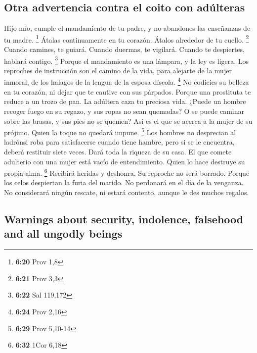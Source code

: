 \begin{paracol}{2}
\hypertarget{otra-advertencia-contra-el-coito-con-aduxfalteras}{%
\subsection{Otra advertencia contra el coito con
adúlteras}\label{otra-advertencia-contra-el-coito-con-aduxfalteras}}

 Hijo mío, cumple el mandamiento de tu padre, y no
abandones las enseñanzas de tu madre. \footnote{\textbf{6:20} Prov 1,8}
 Átalas continuamente en tu corazón. Átalos alrededor de
tu cuello. \footnote{\textbf{6:21} Prov 3,3}  Cuando
camines, te guiará. Cuando duermas, te vigilará. Cuando te despiertes,
hablará contigo. \footnote{\textbf{6:22} Sal 119,172} 
Porque el mandamiento es una lámpara, y la ley es ligera. Los reproches
de instrucción son el camino de la vida,  para alejarte
de la mujer inmoral, de los halagos de la lengua de la esposa díscola.
\footnote{\textbf{6:24} Prov 2,16}  No codicies su
belleza en tu corazón, ni dejar que te cautive con sus párpados.
 Porque una prostituta te reduce a un trozo de pan. La
adúltera caza tu preciosa vida.  ¿Puede un hombre recoger
fuego en su regazo, y sus ropas no sean quemadas?  O se
puede caminar sobre las brasas, y sus pies no se quemen? 
Así es el que se acerca a la mujer de su prójimo. Quien la toque no
quedará impune. \footnote{\textbf{6:29} Prov 5,10-14} 
Los hombres no desprecian al ladrónsi roba para satisfacerse cuando
tiene hambre,  pero si se le encuentra, deberá restituir
siete veces. Dará toda la riqueza de su casa.  El que
comete adulterio con una mujer está vacío de entendimiento. Quien lo
hace destruye su propia alma. \footnote{\textbf{6:32} 1Cor 6,18}
 Recibirá heridas y deshonra. Su reproche no será
borrado.  Porque los celos despiertan la furia del
marido. No perdonará en el día de la venganza.  No
considerará ningún rescate, ni estará contento, aunque le des muchos
regalos.

\switchcolumn
\begin{otherlanguage}{english}

\hypertarget{warnings-about-security-indolence-falsehood-and-all-ungodly-beings}{%
\subsection{Warnings about security, indolence, falsehood and all
ungodly
beings}\label{warnings-about-security-indolence-falsehood-and-all-ungodly-beings}}


\end{otherlanguage}
\end{paracol}
